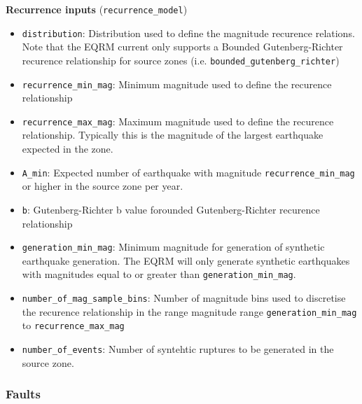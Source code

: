 \textbf{Recurrence inputs} (\texttt{recurrence\_model})
\begin{itemize}
\item \texttt{distribution}: Distribution used to define the magnitude recurence relations. Note that
the EQRM current only supports a Bounded Gutenberg-Richter recurence
relationship for source zones (i.e.
\texttt{bounded\_gutenberg\_richter}) \\
\item \texttt{recurrence\_min\_mag}: Minimum magnitude used to
define the recurence relationship \\
\item \texttt{recurrence\_max\_mag}: Maximum magnitude used to
define the recurence relationship. Typically this is the magnitude
of the largest earthquake expected in the zone. \\
\item \texttt{A\_min}: Expected number of earthquake with magnitude \texttt{recurrence\_min\_mag}
or higher in the source zone per year.
\item \texttt{b}: Gutenberg-Richter b value forounded Gutenberg-Richter recurence
relationship \\
\item \texttt{generation\_min\_mag}: Minimum magnitude for generation of synthetic
earthquake generation. The EQRM will only generate synthetic
earthquakes with magnitudes equal to or greater than
\texttt{generation\_min\_mag}. \\
\item \texttt{number\_of\_mag\_sample\_bins}: Number of magnitude
bins used to discretise the recurence relationship in the range
magnitude range \texttt{generation\_min\_mag} to
\texttt{recurrence\_max\_mag} \\
\item \texttt{number\_of\_events}: Number of syntehtic ruptures to
be generated in the source zone.
\end{itemize}

\subsubsection{Faults}

